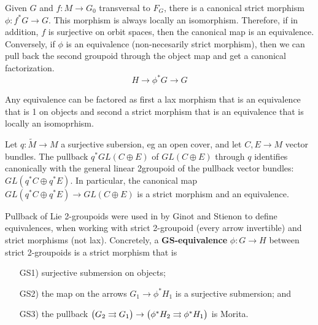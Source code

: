 Given $G$ and $f:M\to G_0$ transversal to $F_G$, there is a canonical strict morphism $\phi:f^*G\to G$. This morphism is always locally an isomorphism. Therefore, if in addition, $f$ is surjective on orbit spaces, then the canonical map is an equivalence. Conversely, if $\phi$ is an equivalence (non-necesarily strict morphism), then we can pull back the second groupoid through the object map and get a canonical factorization.
$$H\to \phi^*G\to G$$

\begin{lemma}
Any equivalence can be factored as first a lax morphism that is an equivalence that is 1 on objects and second a strict morphism that is an equivalence that is locally an isomoprhism.
\end{lemma}

\begin{example}
Let $q:\tilde M\to M$ a surjective subersion, eg an open cover, and let $C,E\to M$ vector bundles.
The pullback $q^*GL(C\oplus E)$ of $GL(C\oplus E)$ through $q$ identifies canonically with the general linear 2groupoid of the pullback vector bundles: $GL(q^*C\oplus q^*E)$. In particular, the canonical map $GL(q^*C\oplus q^*E)\to GL(C\oplus E)$ is a strict morphism and an equivalence.
\end{example}

Pullback of Lie 2-groupoids were used in \cite{gs15} by Ginot and Stienon to define equivalences, when working with strict 2-groupoid (every arrow invertible) and strict morphisms (not lax). Concretely, a {\bf GS-equivalence} $\phi:G\to H$ between strict 2-groupoids is a strict morphism that is
\begin{enumerate}
\item[GS1)] surjective submersion on objects;
\item[GS2)] the map on the arrows $G_1\to \phi^*H_1$ is a surjective submersion; and
\item[GS3)] the pullback $ \big( G_2\rightrightarrows G_1 \big) \to \big( \phi^*H_2\rightrightarrows \phi^*H_1 \big) $ is Morita.
\end{enumerate}

